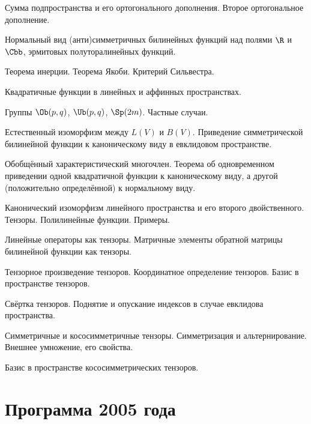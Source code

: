 \documentclass[a4paper]{article}
\begin{document}
\begin{nums}{-2}
Сумма подпространства и его ортогонального дополнения. Второе ортогональное дополнение.
\item Нормальный вид (анти)симметричных билинейных функций над полями $\R$ и $\Cbb$, эрмитовых полуторалинейных функций.
\item Теорема инерции. Теорема Якоби. Критерий Сильвестра.
\item Квадратичные функции в линейных и аффинных пространствах.
\item Группы $\Ob(p,q)$, $\Ub(p,q)$, $\Sp(2m)$. Частные случаи.
\item Естественный изоморфизм между $L(V)$ и $B(V)$. Приведение симметрической билинейной функции к каноническому
виду в евклидовом пространстве.
\item Обобщённый характеристический многочлен. Теорема об одновременном приведении одной квадратичной функции к каноническому
виду, а другой (положительно определённой) к нормальному виду.
\item Канонический изоморфизм линейного пространства и его второго двойственного. Тензоры. Полилинейные функции. Примеры.
\item Линейные операторы как тензоры. Матричные элементы обратной матрицы билинейной функции как тензоры.
\item Тензорное произведение тензоров. Координатное определение тензоров. Базис в пространстве тензоров.
\item Свёртка тензоров. Поднятие и опускание индексов в случае евклидова пространства.
\item Симметричные и кососимметричные тензоры. Симметризация и альтернирование. Внешнее умножение, его свойства.
\item Базис в пространстве кососимметрических тензоров.
\end{nums}

\medskip
\dmvntrail

\pagebreak


\section*{Программа 2005 года}
\end{document}
